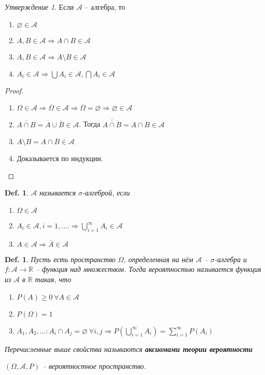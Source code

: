 \documentclass[12pt]{article}
\newenvironment{MyList}[1][4pt]{
  \begin{enumerate}[1.]
  \setlength{\parskip}{0pt}
  \setlength{\itemsep}{#1}
}{       
  \end{enumerate}
}
\def\R{\mathbb{R}}       %
\def\SO{\Rightarrow}     %
\def\Pagebreak{\pagebreak\vspace*{-1.5em}}
\theoremstyle{definition} %
\theoremstyle{plain} %
\newtheorem{Def}[Thm]{Def.} %
\theoremstyle{remark} %
\newtheorem{Prop}[Thm]{Утверждение} %
\begin{document}
\begin{Prop}
    Если $\mathscr{A}$ -- алгебра, то 
    \begin{MyList}
        \item $\varnothing \in \mathscr{A}$ 
        \item $A, B \in \mathscr{A} \SO A \cap B \in \mathscr{A}$ 
        \item $A, B \in \mathscr{A} \SO A \setminus B \in \mathscr{A}$
        \item $A_i \in \mathscr{A} \SO \bigcup A_i \in \mathscr{A}, \bigcap A_i \in \mathscr{A}$  
    \end{MyList}
\end{Prop}

\begin{proof}
    \begin{MyList}
        \item $\Omega \in \mathscr{A} \SO \overline{\Omega} \in \mathscr{A} \SO \overline{\Omega} = \varnothing \SO \varnothing \in \mathscr{A}$
        \item $\overline{A \cap B} = \overline{A} \cup \overline{B} \in \mathscr{A}$. Тогда $\overline{\overline{A \cap B}} = A \cap B \in \mathscr{A}$
        \item $A \setminus B = A \cap \overline{B} \in \mathscr{A}$ 
        \item Доказывается по индукции.  
    \end{MyList}
\end{proof}

\begin{Def}
    $\mathscr{A}$ называется $\sigma$-алгеброй, если 
    \begin{MyList}
        \item $\Omega \in \mathscr{A}$ 
        \item $A_i \in \mathscr{A}, i = 1, .... \SO \bigcup_{i = 1}^\infty A_i \in \mathscr{A}$
        \item $A \in \mathscr{A} \SO \overline{A} \in \mathscr{A}$
    \end{MyList} 
\end{Def}

\begin{Def}
    Пусть есть пространство $\Omega$, определенная на нём $\mathscr{A}$ -- $\sigma$-алгебра и $f: \mathscr{A} \to \R$ -- функция над множеством.
    Тогда вероятностью называется функция из $\mathscr{A}$ в $\R$ такая, что
    \begin{MyList}
        \item $P(A) \geqslant 0 \ \forall A \in \mathscr{A}$ 
        \item $P(\Omega) = 1$
        \item $A_1, A_2, ... : A_i \cap A_j = \varnothing \ \forall i, j \SO P(\bigcup_{i = 1}^\infty A_i) = \sum_{i=1}^{\infty} P(A_i)$  
    \end{MyList}
    Перечисленные выше свойства называются \textbf{аксиомами теории вероятности}
    
    $(\Omega, \mathscr{A}, P)$ -- вероятностное пространство.
\end{Def}
\Pagebreak
\end{document}
